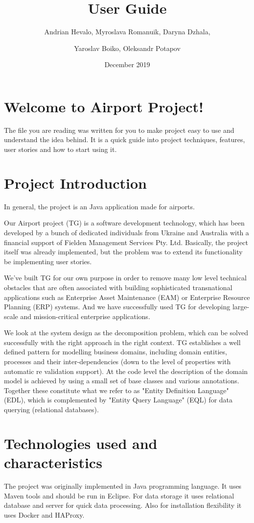 \documentclass{article}
\title{User Guide}
\author{Andrian Hevalo, Myroslava Romanuik, Daryna Dzhala,\and Yaroslav Boiko, Oleksandr Potapov}
\date{December 2019}
\begin{document}
\maketitle

\section{Welcome to Airport Project!}
The file you are reading was written for you to make project easy to use and understand the idea behind. It is a quick guide into project techniques, features, user stories and how to start using it.

\section{Project Introduction}

In general, the project is an Java application made for airports.

Our Airport project (TG) is a software development technology, which has been developed by a bunch of dedicated individuals from Ukraine and Australia with a financial support of Fielden Management Services Pty. Ltd. Basically, the project itself was already implemented, but the problem was to extend its functionality be implementing user stories. 

We've built TG for our own purpose in order to remove many low level technical obstacles that are often associated with building sophisticated transnational applications such as Enterprise Asset Maintenance (EAM) or Enterprise Resource Planning (ERP) systems. And we have successfully used TG for developing large-scale and mission-critical enterprise applications.

We look at the system design as the decomposition problem, which can be solved successfully with the right approach in the right context. TG establishes a well defined pattern for modelling business domains, including domain entities, processes and their inter-dependencies (down to the level of properties with automatic re validation support). At the code level the description of the domain model is achieved by using a small set of base classes and various annotations. Together these constitute what we refer to as "Entity Definition Language" (EDL), which is complemented by "Entity Query Language" (EQL) for data querying (relational databases).


\section{Technologies used and characteristics}
The project was originally implemented in Java programming language. It uses Maven tools and should be run in Eclipse. For data storage it uses relational database and server for quick data processing. Also for installation flexibility it uses Docker and HAProxy.
\end{document}
